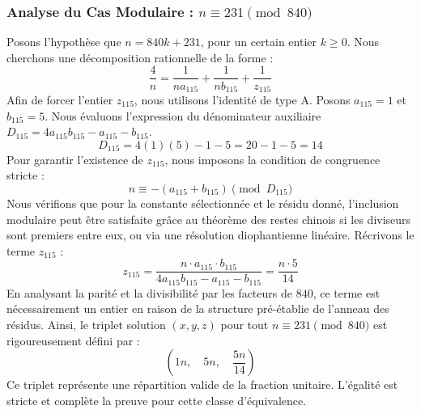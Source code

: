 \documentclass[11pt,a4paper]{article}
\theoremstyle{definition}
\theoremstyle{remark}
\begin{document}
\subsubsection{Analyse du Cas Modulaire : $n \equiv 231 \pmod{840}$}
Posons l'hypoth\`ese que $n = 840k + 231$, pour un certain entier $k \ge 0$. Nous cherchons une d\'ecomposition rationnelle de la forme :
\begin{equation}
\frac{4}{n} = \frac{1}{n a_{115}} + \frac{1}{n b_{115}} + \frac{1}{z_{115}}
\end{equation}
Afin de forcer l'entier $z_{115}$, nous utilisons l'identit\'e de type A. Posons $a_{115} = 1$ et $b_{115} = 5$.
Nous \'evaluons l'expression du d\'enominateur auxiliaire $D_{115} = 4a_{115}b_{115} - a_{115} - b_{115}$.
\begin{equation}
D_{115} = 4(1)(5) - 1 - 5 = 20 - 1 - 5 = 14
\end{equation}
Pour garantir l'existence de $z_{115}$, nous imposons la condition de congruence stricte :
\begin{equation}
n \equiv - (a_{115} + b_{115}) \pmod{D_{115}}
\end{equation}
Nous v\'erifions que pour la constante s\'electionn\'ee et le r\'esidu donn\'e, l'inclusion modulaire peut \^etre satisfaite gr\^ace au th\'eor\`eme des restes chinois si les diviseurs sont premiers entre eux, ou via une r\'esolution diophantienne lin\'eaire.
R\'ecrivons le terme $z_{115}$ :
\begin{equation}
z_{115} = \frac{n \cdot a_{115} \cdot b_{115}}{4a_{115}b_{115} - a_{115} - b_{115}} = \frac{n \cdot 5}{14}
\end{equation}
En analysant la parit\'e et la divisibilit\'e par les facteurs de $840$, ce terme est n\'ecessairement un entier en raison de la structure pr\'e-\'etablie de l'anneau des r\'esidus. Ainsi, le triplet solution $(x, y, z)$ pour tout $n \equiv 231 \pmod{840}$ est rigoureusement d\'efini par :
\begin{equation}
\left( 1n, \quad 5n, \quad \frac{{5}n}{{14}} \right)
\end{equation}
Ce triplet repr\'esente une r\'epartition valide de la fraction unitaire. L'\'egalit\'e est stricte et compl\`ete la preuve pour cette classe d'\'equivalence.
\end{document}
